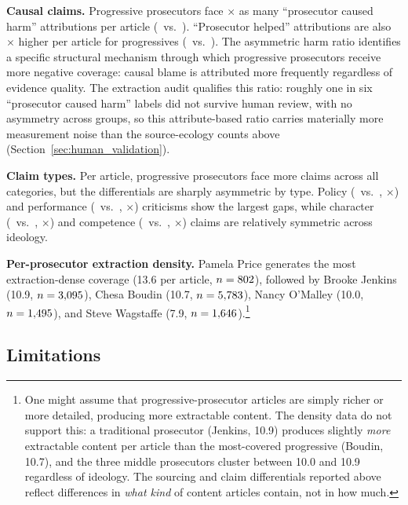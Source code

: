 \documentclass[12pt, letterpaper]{article}
\begin{document}
\begin{appendices}
\textbf{Causal claims.} Progressive prosecutors face \HarmRatio$\times$ as many ``prosecutor caused harm'' attributions per article (\ProgHarmPerArticle\ vs.\ \TradHarmPerArticle). ``Prosecutor helped'' attributions are also \HelpedRatio$\times$ higher per article for progressives (\ProgHelpedPerArticle\ vs.\ \TradHelpedPerArticle). The asymmetric harm ratio identifies a specific structural mechanism through which progressive prosecutors receive more negative coverage: causal blame is attributed more frequently regardless of evidence quality. The extraction audit qualifies this ratio: roughly one in six ``prosecutor caused harm'' labels did not survive human review, with no asymmetry across groups, so this attribute-based ratio carries materially more measurement noise than the source-ecology counts above (Section~\ref{sec:human_validation}).

\textbf{Claim types.} Per article, progressive prosecutors face more claims across all categories, but the differentials are sharply asymmetric by type. Policy (\ProgPolicyClaimRate\ vs.\ \TradPolicyClaimRate, \PolicyClaimRatio$\times$) and performance (\ProgPerformanceClaimRate\ vs.\ \TradPerformanceClaimRate, \PerformanceClaimRatio$\times$) criticisms show the largest gaps, while character (\ProgCharacterClaimRate\ vs.\ \TradCharacterClaimRate, \CharacterClaimRatio$\times$) and competence (\ProgCompetenceClaimRate\ vs.\ \TradCompetenceClaimRate, \CompetenceClaimRatio$\times$) claims are relatively symmetric across ideology.

\textbf{Per-prosecutor extraction density.} Pamela Price generates the most extraction-dense coverage (13.6 per article, $n=802$), followed by Brooke Jenkins (10.9, $n=3{,}095$), Chesa Boudin (10.7, $n=5{,}783$), Nancy O'Malley (10.0, $n=1{,}495$), and Steve Wagstaffe (7.9, $n=1{,}646$).\footnote{One might assume that progressive-prosecutor articles are simply richer or more detailed, producing more extractable content. The density data do not support this: a traditional prosecutor (Jenkins, 10.9) produces slightly \emph{more} extractable content per article than the most-covered progressive (Boudin, 10.7), and the three middle prosecutors cluster between 10.0 and 10.9 regardless of ideology. The sourcing and claim differentials reported above reflect differences in \emph{what kind} of content articles contain, not in how much.}

\subsection*{Limitations}


\end{appendices}
\end{document}

